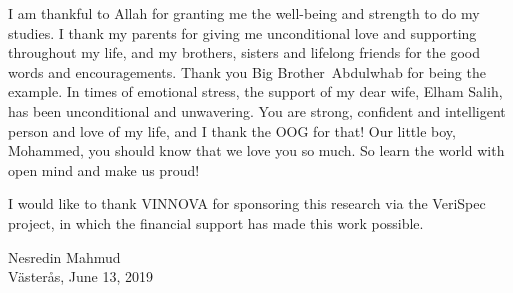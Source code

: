 {I am thankful to Allah for granting me the well-being and strength to do my studies. I thank my parents for giving me unconditional love and supporting throughout my life, and my brothers, sisters and lifelong friends for the good words and encouragements. Thank you Big Brother~Abdulwhab for being the example. In times of emotional stress, the support of my dear wife, Elham Salih, has been unconditional and unwavering. You are strong, confident and intelligent person and love of my life, and I thank the OOG for that! Our little boy, Mohammed, you should know that we love you so much. So learn the world with open mind and make us proud!

I would like to thank VINNOVA for sponsoring this research via the VeriSpec project, in which the financial support has made this work possible.

\begin{flushright}
Nesredin Mahmud\\
V{\"a}ster{\aa}s, June 13, 2019
\end{flushright}


} %

